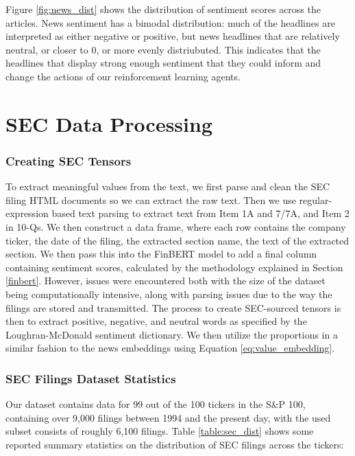 Figure \ref{fig:news_dist} shows the distribution of sentiment scores across the articles.
News sentiment has a bimodal distribution: much of the headlines are interpreted as either negative or positive, but news headlines that are relatively neutral, or closer to 0, or more evenly distriubuted. 
This indicates that the headlines that display strong enough sentiment that they could inform and change the actions of our reinforcement learning agents.



\section{SEC Data Processing}

\subsubsection{Creating SEC Tensors}
To extract meaningful values from the text, we first parse and clean the SEC filing HTML documents so we can extract the raw text.
Then we use regular-expression based text parsing to extract text from Item 1A and 7/7A, and Item 2 in 10-Qs.
We then construct a data frame, where each row contains the company ticker, the date of the filing, the extracted section name, the text of the extracted section.
We then pass this into the FinBERT model to add a final column containing sentiment scores, calculated by the methodology explained in Section \ref{finbert}.
However, issues were encountered both with the size of the dataset being computationally intensive, along with parsing issues due to the way the filings are stored and transmitted.
The process to create SEC-sourced tensors is then to extract positive, negative, and neutral words as specified by the Loughran-McDonald sentiment dictionary.
We then utilize the proportions in a similar fashion to the news embeddings using Equation \eqref{eq:value_embedding}.

\subsubsection{SEC Filings Dataset Statistics}
Our dataset contains data for 99 out of the 100 tickers in the S\&P 100, containing over 9,000 filings between 1994 and the present day, with the used subset consists of roughly 6,100 filings.
Table \ref{table:sec_dist} shows some reported summary statistics on the distribution of SEC filings across the tickers:

